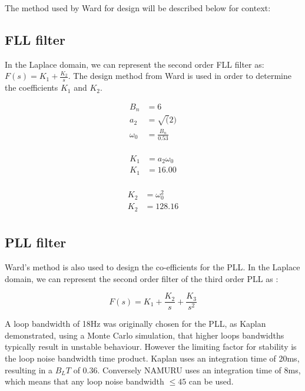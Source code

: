 The method used by Ward for design will be described below for context: 

\subsection{\ac{FLL} filter}
In the Laplace domain, we can represent the second order \ac{FLL} filter as:  $F(s) = K_1 + \frac{K_2}{s}$. The design method from Ward \cite{Ward} is used in order to determine the coefficients $K_1$ and $K_2$.  

\begin{align*}
B_n &= 6\\
a_2 &= \sqrt(2)\\
\omega_{0}&=\frac{B_n}{0.53}\\
\end{align*}

\begin{equation} \label{eq1}
\begin{split}
K_1 & = a_2 \omega_{0}\\
K_1 & = 16.00\\
\end{split}
\end{equation}

\begin{equation} \label{eq2}
\begin{split}
K_2 & = \omega_{0}^2\\
K_2 & = 128.16\\
\end{split}
\end{equation}

\subsection{\ac{PLL} filter}
Ward's method is also used to design the co-efficients for the \ac{PLL}. In the Laplace domain, we can represent the second order filter  of the third order \ac{PLL} as : 

\begin{equation} \label{eq6}
F(s) = K_1 + \frac{K_2}{s} + \frac{K_3}{s^2}
\end{equation}

A loop bandwidth of 18Hz was originally chosen for the \ac{PLL}, as Kaplan\cite{Kaplan} demonstrated, using a Monte Carlo simulation, that higher loops bandwidths typically result in unstable behaviour. However the limiting factor for stability is the loop noise bandwidth time product. Kaplan uses an integration time of 20ms, resulting in a $B_LT$ of 0.36. Conversely \ac{NAMURU} uses an integration time of 8ms, which means that any loop noise bandwidth $\leq 45$ can be used. 

